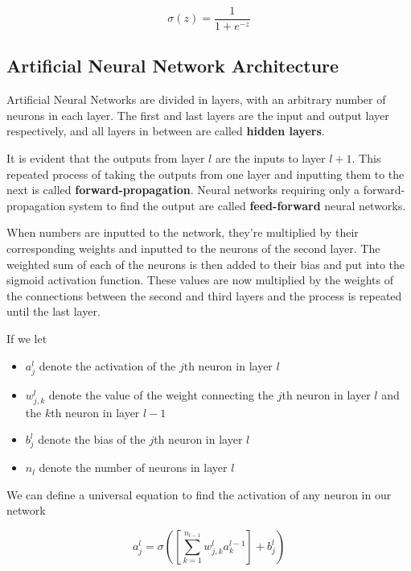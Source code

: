 \documentclass{article}
\begin{document}
\begin{equation}
    \sigma(z)=\frac{1}{1+e^{-z}}    
\end{equation}

\subsection{Artificial Neural Network Architecture}
Artificial Neural Networks are divided in layers, with an arbitrary number of neurons in each layer. The first and last layers are the input and output layer respectively, and all layers in between are called \textbf{hidden layers}.

It is evident that the outputs from layer $l$ are the inputs to layer $l+1$. This repeated process of taking the outputs from one layer and inputting them to the next is called \textbf{forward-propagation}. Neural networks requiring only a forward-propagation system to find the output are called \textbf{feed-forward} neural networks.

When numbers are inputted to the network, they're multiplied by their corresponding weights and inputted to the neurons of the second layer. The weighted sum of each of the neurons is then added to their bias and put into the sigmoid activation function. These values are now multiplied by the weights of the connections between the second and third layers and the process is repeated until the last layer.

If we let

\begin{itemize}
    \item $a_{j}^{l}$ denote the activation of the $j$th neuron in layer $l$
    \item $w_{j, k}^{l}$ denote the value of the weight connecting the $j$th neuron in layer $l$ and the $k$th neuron in layer $l-1$
    \item $b_{j}^{l}$ denote the bias of the $j$th neuron in layer $l$
    \item $n_{l}$ denote the number of neurons in layer $l$
\end{itemize}

We can define a universal equation to find the activation of any neuron in our network

\large
\begin{equation}
    a_{j}^{l}=\sigma\left(\left[\sum_{k=1}^{n_{l-1}}{w_{j, k}^{l}a_{k}^{l-1}}\right]+b_{j}^{l}\right)
\end{equation}
\normalsize
\end{document}
